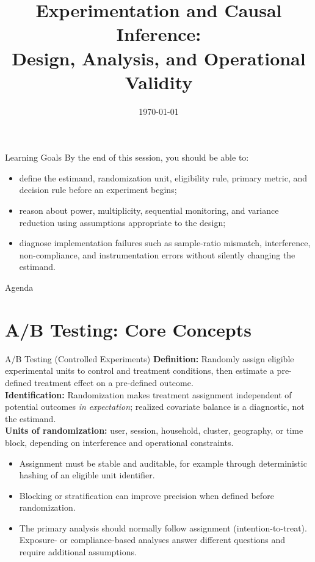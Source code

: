 \documentclass[aspectratio=169]{beamer}
\title[Experimentation \& Causal Inference]{Experimentation and Causal Inference:\\
Design, Analysis, and Operational Validity}
\date{\today}
\begin{document}
\begin{frame}
  \titlepage
\end{frame}

\begin{frame}{Learning Goals}
  By the end of this session, you should be able to:
  \begin{itemize}
    \item define the estimand, randomization unit, eligibility rule, primary metric, and decision rule before an experiment begins;
    \item reason about power, multiplicity, sequential monitoring, and variance reduction using assumptions appropriate to the design;
    \item diagnose implementation failures such as sample-ratio mismatch, interference, non-compliance, and instrumentation errors without silently changing the estimand.
  \end{itemize}
\end{frame}

\begin{frame}{Agenda}
  \tableofcontents
\end{frame}

\section{A/B Testing: Core Concepts}
\begin{frame}{A/B Testing (Controlled Experiments)}
  \textbf{Definition:} Randomly assign eligible experimental units to control and treatment conditions, then estimate a pre-defined treatment effect on a pre-defined outcome.\\[0.5em]
  \textbf{Identification:} Randomization makes treatment assignment independent of potential outcomes \emph{in expectation}; realized covariate balance is a diagnostic, not the estimand.\\[0.5em]
  \textbf{Units of randomization:} user, session, household, cluster, geography, or time block, depending on interference and operational constraints.
  \begin{itemize}
    \item Assignment must be stable and auditable, for example through deterministic hashing of an eligible unit identifier.
    \item Blocking or stratification can improve precision when defined before randomization.
    \item The primary analysis should normally follow assignment (intention-to-treat). Exposure- or compliance-based analyses answer different questions and require additional assumptions.
  \end{itemize}
\end{frame}
\end{document}
